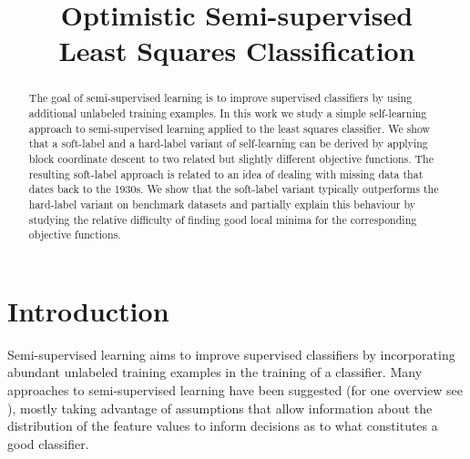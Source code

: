 \documentclass[conference,a4paper,10pt]{IEEEtran}\usepackage[]{graphicx}\usepackage[]{color}
\begin{document}
\title{Optimistic Semi-supervised \\ Least Squares Classification}

\author{
}


\maketitle

\begin{abstract}
The goal of semi-supervised learning is to improve supervised classifiers by using additional unlabeled training examples. In this work we study a simple self-learning approach to semi-supervised learning applied to the least squares classifier. We show that a soft-label and a hard-label variant of self-learning can be derived by applying block coordinate descent to two related but slightly different objective functions. The resulting soft-label approach is related to an idea of dealing with missing data that dates back to the 1930s. We show that the soft-label variant typically outperforms the hard-label variant on benchmark datasets and partially explain this behaviour by studying the relative difficulty of finding good local minima for the corresponding objective functions.
\end{abstract}

\IEEEpeerreviewmaketitle

\section{Introduction}
Semi-supervised learning aims to improve supervised classifiers by incorporating abundant unlabeled training examples in the training of a classifier. Many approaches to semi-supervised learning have been suggested (for one overview see \cite{Chapelle2006}), mostly taking advantage of assumptions that allow information about the distribution of the feature values to inform decisions as to what constitutes a good classifier.
\end{document}
